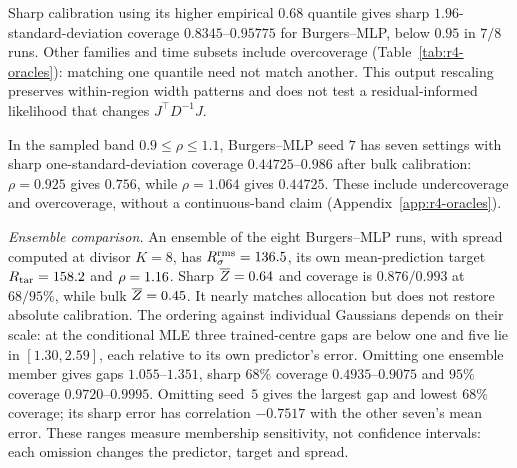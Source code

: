 Sharp calibration using its higher empirical $0.68$ quantile gives sharp
$1.96$-standard-deviation coverage $0.8345$--$0.95775$ for Burgers--MLP, below
$0.95$ in $7/8$ runs. Other families and time subsets include overcoverage
(Table~\ref{tab:r4-oracles}): matching one quantile need not match another.
This output rescaling preserves within-region width patterns and does not test
a residual-informed likelihood that changes $J^\top D^{-1}J$.

In the sampled band $0.9\le\rho\le1.1$, Burgers--MLP seed $7$ has seven
settings with sharp one-standard-deviation coverage $0.44725$--$0.986$ after
bulk calibration: $\rho=0.925$ gives $0.756$, while $\rho=1.064$ gives $0.44725$.
These include undercoverage and overcoverage, without a continuous-band claim
(Appendix~\ref{app:r4-oracles}).

\emph{Ensemble comparison.}
An ensemble \citep{lakshminarayanan2017ensembles} of the eight Burgers--MLP runs, with
spread computed at divisor $K=8$, has $R_{\sigma}^{\mathrm{rms}}=136.5$, its own mean-prediction target
$R_{\mathrm{tar}}=158.2$ and $\rho=1.16$. Sharp $\overline{Z}=0.64$ and coverage is $0.876/0.993$
at $68/95\%$, while bulk $\overline{Z}=0.45$. It nearly matches allocation but does not restore
absolute calibration. The ordering against individual Gaussians depends on their scale:
at the conditional MLE three trained-centre gaps are below one and five lie in
$[1.30,2.59]$, each relative to its own predictor's error. Omitting one ensemble member
gives gaps $1.055$--$1.351$, sharp $68\%$ coverage $0.4935$--$0.9075$ and $95\%$ coverage
$0.9720$--$0.9995$. Omitting seed~$5$ gives the largest gap and lowest $68\%$ coverage;
its sharp error has correlation $-0.7517$ with the other seven's mean error. These ranges
measure membership sensitivity, not confidence intervals: each omission changes the
predictor, target and spread.

